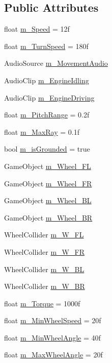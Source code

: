 \subsection*{Public Attributes}
\begin{DoxyCompactItemize}
\item 
float \hyperlink{class_tank_movement_a946b8dddff1ced5a2bc6e2c81734c9a9}{m\+\_\+\+Speed} = 12f
\item 
float \hyperlink{class_tank_movement_a3d4a37dc23ba03bcd56c6272213e81e1}{m\+\_\+\+Turn\+Speed} = 180f
\item 
Audio\+Source \hyperlink{class_tank_movement_adeb10deeb3d19a4e09a373009472d30d}{m\+\_\+\+Movement\+Audio}
\item 
Audio\+Clip \hyperlink{class_tank_movement_afd7b9063830e3f36586d8f65ce9e9864}{m\+\_\+\+Engine\+Idling}
\item 
Audio\+Clip \hyperlink{class_tank_movement_a1f8950f3ace7c6eb9db3245e56a3e242}{m\+\_\+\+Engine\+Driving}
\item 
float \hyperlink{class_tank_movement_ac40fed4b4da6dfb71113b1fe0061c251}{m\+\_\+\+Pitch\+Range} = 0.\+2f
\item 
float \hyperlink{class_tank_movement_a127489016583e74eba8e51855d52140f}{m\+\_\+\+Max\+Ray} = 0.\+1f
\item 
bool \hyperlink{class_tank_movement_aabbb207575a9a7e1402f8dedfe57a2ae}{m\+\_\+is\+Grounded} = true
\item 
Game\+Object \hyperlink{class_tank_movement_ad429eeb7e51260ede34edd1497a5e746}{m\+\_\+\+Wheel\+\_\+\+FL}
\item 
Game\+Object \hyperlink{class_tank_movement_ac1530da9ca85a2fc03ad0e157779b277}{m\+\_\+\+Wheel\+\_\+\+FR}
\item 
Game\+Object \hyperlink{class_tank_movement_a8cdcf38aa1a90dd677203e3c20d77dd5}{m\+\_\+\+Wheel\+\_\+\+BL}
\item 
Game\+Object \hyperlink{class_tank_movement_a2502e9dc69516fb41e8781563c2d1cbe}{m\+\_\+\+Wheel\+\_\+\+BR}
\item 
Wheel\+Collider \hyperlink{class_tank_movement_ab0123b63cc13e4df1e9012b797b1f6ae}{m\+\_\+\+W\+\_\+\+FL}
\item 
Wheel\+Collider \hyperlink{class_tank_movement_ab9a83a1b293c87eacedd96ab8ecc6c97}{m\+\_\+\+W\+\_\+\+FR}
\item 
Wheel\+Collider \hyperlink{class_tank_movement_a4937ea53208a0c13fb66e10be5ddea1e}{m\+\_\+\+W\+\_\+\+BL}
\item 
Wheel\+Collider \hyperlink{class_tank_movement_acb48d092541024d69905b0d29400b0ac}{m\+\_\+\+W\+\_\+\+BR}
\item 
float \hyperlink{class_tank_movement_a91715c98a7e32de422b88eb6d47f7b34}{m\+\_\+\+Torque} = 1000f
\item 
float \hyperlink{class_tank_movement_ab396d17831baf3a1f26d894b6c972595}{m\+\_\+\+Min\+Wheel\+Speed} = 20f
\item 
float \hyperlink{class_tank_movement_a272f5b92b7350a9ad9f45f5bd7fa873e}{m\+\_\+\+Min\+Wheel\+Angle} = 40f
\item 
float \hyperlink{class_tank_movement_aa00410cb9946e3d519e7eb0c27a3f71e}{m\+\_\+\+Max\+Wheel\+Angle} = 20f
\end{DoxyCompactItemize}


